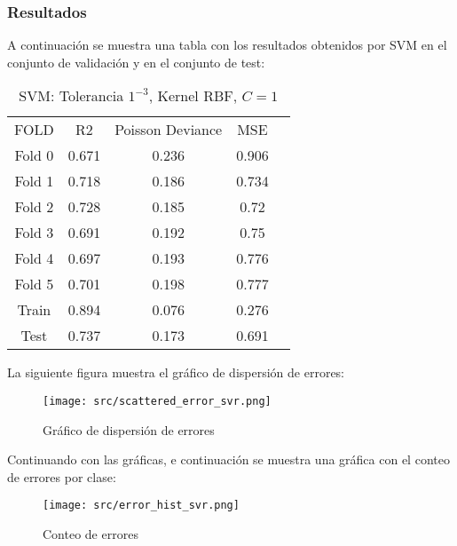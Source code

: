\subsubsection*{Resultados}
A continuación se muestra una tabla con los resultados obtenidos por SVM en el conjunto de validación y en el conjunto de test:
\begin{table}[H]
	\centering
	\begin{tabular}{|c|c|c|c|c}
		\cline{1-4}
		FOLD   & R2    & Poisson Deviance & MSE   \\ \cline{1-4}
		Fold 0 & 0.671 & 0.236            & 0.906 \\ \cline{1-4}
		Fold 1 & 0.718 & 0.186            & 0.734 \\ \cline{1-4}
		Fold 2 & 0.728 & 0.185            & 0.72  \\ \cline{1-4}
		Fold 3 & 0.691 & 0.192            & 0.75  \\ \cline{1-4}
		Fold 4 & 0.697 & 0.193            & 0.776 \\ \cline{1-4}
		Fold 5 & 0.701 & 0.198            & 0.777 \\ \cline{1-4}
		Train  & 0.894 & 0.076            & 0.276 \\ \cline{1-4}
		Test   & 0.737 & 0.173            & 0.691 \\ \cline{1-4}
	\end{tabular}
	\caption{SVM: Tolerancia $1^{-3}$, Kernel RBF, $C=1$}
	\label{tab:svm_res}
\end{table}
La siguiente figura muestra el gráfico de dispersión de errores:
\begin{figure}[H]
	\centering
	\texttt{[image: src/scattered\_error\_svr.png]}
	\caption{Gráfico de dispersión de errores}
	\label{fig:svr_scattered}
\end{figure}
Continuando con las gráficas, e continuación se muestra una gráfica con el conteo de errores por clase:\\
\linebreak
\begin{figure}[H]
	\centering
	\texttt{[image: src/error\_hist\_svr.png]}
	\caption{Conteo de errores}
	\label{fig:svr_error_plot}
\end{figure}
